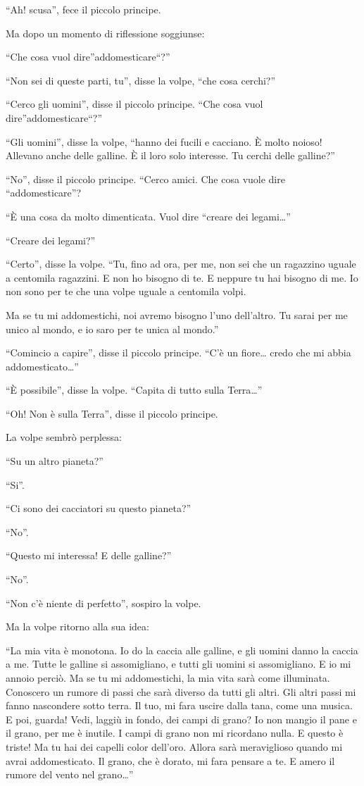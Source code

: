 \documentclass[11pt]{scrbook}
\begin{document}
``Ah! scusa'', fece il piccolo principe.

Ma dopo un momento di riflessione soggiunse:

``Che cosa vuol dire''addomesticare``?''

``Non sei di queste parti, tu'', disse la volpe, ``che cosa cerchi?''

``Cerco gli uomini'', disse il piccolo principe. ``Che cosa vuol dire''addomesticare``?''

``Gli uomini'', disse la volpe, ``hanno dei fucili e cacciano. È molto noioso! Allevano anche delle galline. È il loro solo interesse. Tu cerchi delle galline?''

``No'', disse il piccolo principe. ``Cerco amici. Che cosa vuole dire ``addomesticare''?

``È una cosa da molto dimenticata. Vuol dire ``creare dei legami\ldots{}''

``Creare dei legami?''

``Certo'', disse la volpe. ``Tu, fino ad ora, per me, non sei che un ragazzino uguale a centomila ragazzini. E non ho bisogno di te. E neppure tu hai bisogno di me. Io non sono per te che una volpe uguale a centomila volpi.

Ma se tu mi addomestichi, noi avremo bisogno l'uno dell'altro. Tu sarai per me unico al mondo, e io saro per te unica al mondo.''

``Comincio a capire'', disse il piccolo principe. ``C'è un fiore\ldots{} credo che mi abbia addomesticato\ldots{}''

``È possibile'', disse la volpe. ``Capita di tutto sulla Terra\ldots{}''

``Oh! Non è sulla Terra'', disse il piccolo principe.

La volpe sembrò perplessa:

``Su un altro pianeta?''

``Si''.

``Ci sono dei cacciatori su questo pianeta?''

``No''.

``Questo mi interessa! E delle galline?''

``No''.

``Non c'è niente di perfetto'', sospiro la volpe.

Ma la volpe ritorno alla sua idea:

``La mia vita è monotona. Io do la caccia alle galline, e gli uomini danno la caccia a me. Tutte le galline si assomigliano, e tutti gli uomini si assomigliano. E io mi annoio perciò. Ma se tu mi addomestichi, la mia vita sarà come illuminata. Conoscero un rumore di passi che sarà diverso da tutti gli altri. Gli altri passi mi fanno nascondere sotto terra. Il tuo, mi fara uscire dalla tana, come una musica. E poi, guarda! Vedi, laggiù in fondo, dei campi di grano? Io non mangio il pane e il grano, per me è inutile. I campi di grano non mi ricordano nulla. E questo è triste! Ma tu hai dei capelli color dell'oro. Allora sarà meraviglioso quando mi avrai addomesticato. Il grano, che è dorato, mi fara pensare a te. E amero il rumore del vento nel grano\ldots{}''
\end{document}
